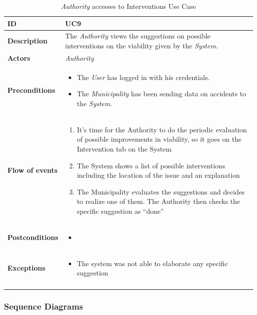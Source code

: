 \documentclass {article}
\begin{document}
	\begin{longtable}{| p{3 cm} | p{10.5cm} |} 
			\hline
			{\bf ID} & UC9 \\
			\hline
			{\bf Description} & The {\it Authority} views the suggestions on possible interventions on the viability given by the {\it System}. \\
			\hline
			{\bf Actors} & {\it Authority}\\
			\hline
			{\bf Preconditions} & \begin{itemize}
								  \item The {\it User} has logged in with his credentials.
								  \item The {\it Municipality} has been sending data on accidents to the {\it System}.
								  \end{itemize}	\\
			\hline
			{\bf Flow of events} &	\begin{enumerate}
								  \item It’s time for the Authority to do the periodic evaluation of possible improvements in viability, so it goes on the Intervention tab on the System
								  \item The System shows a list of possible interventions including the location of the issue and an explanation
								  \item The Municipality evaluates the suggestions and decides to realize one of them. The Authority then checks the specific suggestion as “done”
								  \end{enumerate}	\\
			\hline
			{\bf Postconditions} & \begin{itemize}
								  \item
								  \end{itemize}	 \\
			\hline
			{\bf Exceptions} & 	\begin{itemize}
								  \item The system was not able to elaborate any specific suggestion
								  \end{itemize}	\\
			\hline
			\caption{{\it Authority} accesses to Interventions Use Case}
			\end{longtable}

	\subsubsection{Sequence Diagrams}
\end{document}
